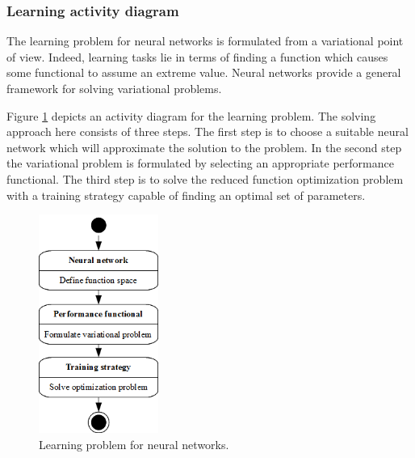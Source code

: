\subsubsection*{Learning activity diagram}

The learning problem for neural networks is formulated from a
variational point of view. Indeed, learning tasks lie in terms
of finding a function which causes some functional to assume an
extreme value. Neural networks provide a
general framework for solving variational problems.

Figure \ref{LearningActivityDiagram} depicts an activity diagram for the learning problem. 
The solving approach
here consists of three steps. The first step is to choose a suitable
neural network which will approximate the solution to the problem. 
In the second step the
variational problem is formulated by selecting an appropriate
performance functional.
The third step is to solve the reduced function optimization
problem with a training strategy capable of
finding an optimal set of parameters.

\begin{figure}[h!]
\begin{center}
\includegraphics[width=0.35\textwidth]{neural_networks_basis/learning_problem}
\caption{Learning problem for neural networks.}\label{LearningActivityDiagram}
\end{center}
\end{figure}
